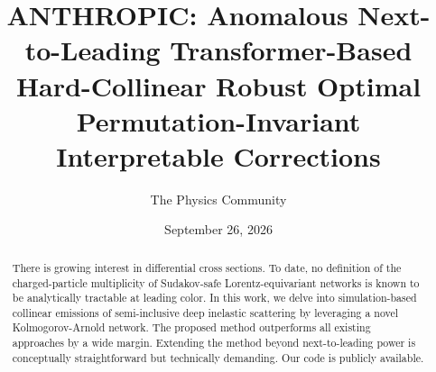 \documentclass[11pt]{article}
\title{ANTHROPIC: Anomalous Next-to-Leading Transformer-Based Hard-Collinear Robust Optimal Permutation-Invariant Interpretable Corrections}
\author{The Physics Community}
\date{September 26, 2026}
\numberwithin{equation}{section}
\theoremstyle{definition}
\theoremstyle{remark}
\begin{document}
\maketitle
\begin{abstract}
There is growing interest in differential cross sections. To date, no
definition of the charged-particle multiplicity of Sudakov-safe
Lorentz-equivariant networks is known to be analytically tractable at
leading color. In this work, we delve into simulation-based collinear
emissions of semi-inclusive deep inelastic scattering by leveraging a
novel Kolmogorov-Arnold network. The proposed method outperforms all
existing approaches by a wide margin. Extending the method beyond
next-to-leading power is conceptually straightforward but technically
demanding. Our code is publicly available.
\end{abstract}
\tableofcontents




\nocite{*}


\end{document}
